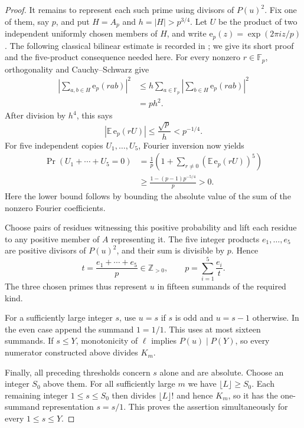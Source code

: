 \begin{proof}
It remains to represent each such prime using divisors of $P(u)^2$.
Fix one of them, say $p$, and put $H=A_p$ and $h=|H|>p^{3/4}$.
Let $U$ be the product of two independent uniformly chosen members of
$H$, and write $\mathrm e_p(z)=\exp(2\pi i z/p)$.
The following classical bilinear estimate is recorded in
\cite[Proposition~1.1]{GlibichukKonyagin2007}; we give its short proof
and the five-product consequence needed here.
For every nonzero $r\in\mathbb F_p$, orthogonality and
Cauchy--Schwarz give
\begin{align*}
 \left|\sum_{a,b\in H}\mathrm e_p(rab)\right|^2
 &\leq h\sum_{a\in\mathbb F_p}
       \left|\sum_{b\in H}\mathrm e_p(rab)\right|^2\\
 &=ph^2.
\end{align*}
After division by $h^4$, this says
\[
 \left|\mathbb E\,\mathrm e_p(rU)\right|
 \leq\frac{\sqrt p}{h}<p^{-1/4}.
\]
For five independent copies $U_1,\ldots,U_5$, Fourier inversion now yields
\begin{align*}
 \Pr(U_1+\cdots+U_5=0)
 &=\frac1p\left(1+\sum_{r\ne0}
                   (\mathbb E\,\mathrm e_p(rU))^5\right)\\
 &\geq\frac{1-(p-1)p^{-5/4}}p>0.
\end{align*}
Here the lower bound follows by bounding the absolute value of the sum
of the nonzero Fourier coefficients.

Choose pairs of residues witnessing this positive probability and lift
each residue to any positive member of $A$ representing it.  The five
integer products $e_1,\ldots,e_5$ are positive divisors of $P(u)^2$,
and their sum is divisible by $p$.  Hence
\[
 t=\frac{e_1+\cdots+e_5}{p}\in\mathbb Z_{>0},\qquad
 p=\sum_{i=1}^{5}\frac{e_i}{t}.
\]
The three chosen primes thus represent $u$ in fifteen summands of the
required kind.

For a sufficiently large integer $s$, use $u=s$ if $s$ is odd and
$u=s-1$ otherwise.  In the even case append the summand $1=1/1$.
This uses at most sixteen summands.  If $s\leq Y$, monotonicity of
$\ell$ implies $P(u)\mid P(Y)$, so every numerator constructed above
divides $K_m$.

Finally, all preceding thresholds concern $s$ alone and are absolute.
Choose an integer $S_0$ above them.  For all sufficiently large $m$ we
have $\lfloor L\rfloor\geq S_0$.  Each remaining integer
$1\leq s\leq S_0$ then divides $\lfloor L\rfloor!$ and hence $K_m$,
so it has the one-summand representation $s=s/1$.  This proves the
assertion simultaneously for every $1\leq s\leq Y$.
\end{proof}

